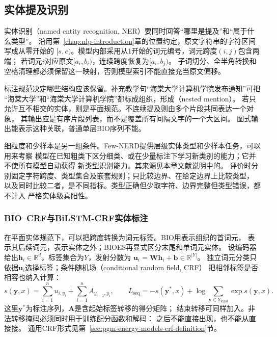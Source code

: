 \FloatBarrier
\subsection{实体提及识别}
\label{sec:nlp-extraction-mentions}

实体识别（named entity recognition, NER）要同时回答“哪里是提及”和“属于什么类型”。
沿用第~\ref{chap:nlp-introduction}章的位置约定，原文字符串的字符区间写成从零开始的
$[s,e)$。模型内部采用从1开始的词元编号，词元跨度$(i,j)$包含两端；
若词元$i$对应原文$[a_i,b_i)$，连续跨度恢复为$[a_i,b_j)$。
子词切分、全半角转换和空格清理都必须保留这一映射，否则模型索引不能直接充当原文偏移。

标注规范决定哪些结构应该保留。补充教学句“海棠大学计算机学院发布通知”可把
“海棠大学”和“海棠大学计算机学院”都标成组织，形成（nested mention）。
若只允许互不相交的实体，则是平面规范。不连续提及则由多个片段共同表达一个对象，
其输出应是有序片段列表，而不是覆盖所有间隔文字的一个大区间。
图式输出能表示这种关联，普通单层BIO序列不能。

细粒度和少样本是另一组条件。Few-NERD提供层级实体类型和少样本任务，可以用来考察
模型在已知粗类下区分细类、或在少量标注下学习新类别的能力；它并不使所有模型自动获得
新类型识别能力。其来源见本章文献说明中的。
评价时分别固定字符跨度、类型集合及嵌套规则；只比较边界、在给定边界上比较类型，
以及同时比较二者，是不同指标。类型正确但少取字符、边界完整但类型错误，都不计入
严格实体级真阳性。

\subsubsection{BIO--CRF与BiLSTM-CRF实体标注}
\label{sec:nlp-extraction-bio}

在平面实体规范下，可以把跨度转换为词元标签。BIO用表示组织的首词元，
表示其后续词元，表示实体之外；BIOES再显式区分末尾和单词元实体。
设编码器给出$\bm{h}_i\in\mathbb{R}^{d}$，标签集合为$Y$，发射分数为
$\bm{u}_i=\bm{W}\bm{h}_i+\bm{b}\in\mathbb{R}^{|Y|}$。
独立词元分类只依据$\bm{u}_i$选择标签；条件随机场（conditional random field, CRF）
把相邻标签是否相容也纳入计算：
\begin{equation}
  s(\bm{y},x)=
  \sum_{i=1}^{n}u_{i,y_i}
  +\sum_{i=1}^{n}A_{y_{i-1},y_i},
  \qquad
  L_{\mathrm{seq}}=-s(\bm{y}^{*},x)
  +\log\sum_{\bm{y}\in Y_{\mathrm{legal}}}\exp s(\bm{y},x).
  \label{eq:nlp-extraction-crf}
\end{equation}
这里$\bm{y}^{*}$为标注序列，$\bm{A}$是含起始标签转移的得分矩阵；
结束转移可同样加入。非法转移掩码必须同时用于训练配分函数和解码：
之后不能直接出现，也不能从直接接。
通用CRF形式见第~\ref{sec:pgm-energy-models-crf-definition}节。

